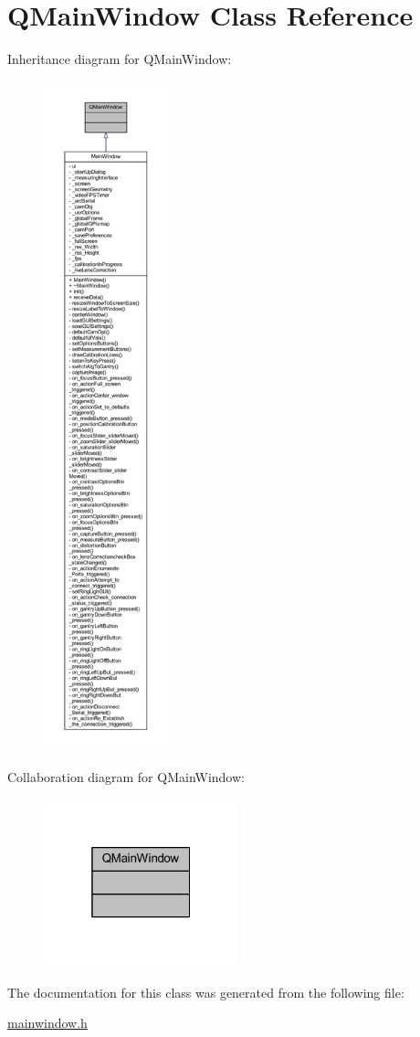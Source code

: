 \hypertarget{class_q_main_window}{}\section{Q\+Main\+Window Class Reference}
\label{class_q_main_window}


Inheritance diagram for Q\+Main\+Window\+:
\nopagebreak
\begin{figure}[H]
\begin{center}
\leavevmode
\includegraphics[height=550pt]{class_q_main_window__inherit__graph}
\end{center}
\end{figure}


Collaboration diagram for Q\+Main\+Window\+:\nopagebreak
\begin{figure}[H]
\begin{center}
\leavevmode
\includegraphics[width=160pt]{class_q_main_window__coll__graph}
\end{center}
\end{figure}


The documentation for this class was generated from the following file\+:\begin{DoxyCompactItemize}
\item 
\mbox{\hyperlink{mainwindow_8h}{mainwindow.\+h}}\end{DoxyCompactItemize}
